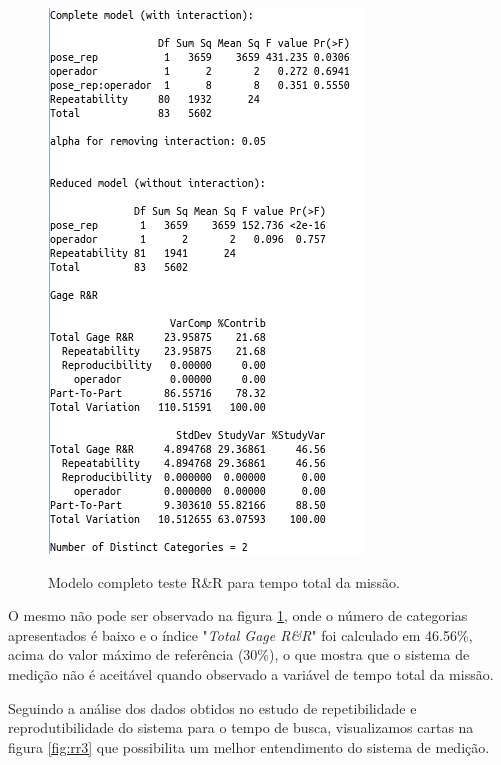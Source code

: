 \begin{figure}[H]
  \caption{Modelo completo teste R\&R para tempo total da missão.}
  \centering
  \includegraphics[scale=0.55]{images/rr_tt.png}
  \label{fig:rr2}
\end{figure}

O mesmo não pode ser observado na figura \ref*{fig:rr2}, onde o número de categorias apresentados é baixo e o índice "\textit{Total Gage R\&R}" foi calculado em 46.56\%, acima do valor máximo de referência (30\%), o que mostra que o sistema de medição não é aceitável quando observado a variável de tempo total da missão.  

Seguindo a análise dos dados obtidos no estudo de repetibilidade e reprodutibilidade do sistema para o tempo de busca, visualizamos cartas na figura \ref*{fig:rr3} que possibilita um melhor entendimento do sistema de medição.

